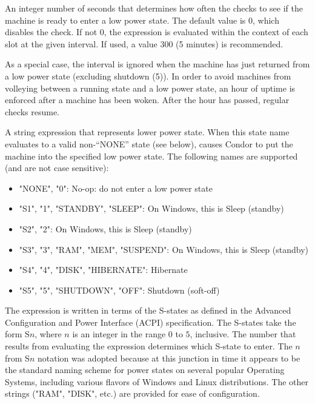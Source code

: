 \begin{description}

\label{param:HibernateCheckInterval}
\item[\Macro{HIBERNATE\_CHECK\_INTERVAL}]
  An integer number of seconds that
  determines how often the  checks to see if the 
  machine is ready to enter a low power state.
  The default value is 0,
  which disables the check.
  If not 0, the  expression is
  evaluated within the context of each slot at the given interval.  
  If used, a value 300 (5 minutes) is recommended.

  As a special case, the interval is ignored when the 
  machine has just returned from a low power state (excluding 
  shutdown (5)).  In order to avoid machines from volleying between 
  a running state and a low power state, an hour of uptime is enforced
  after a machine has been woken.  After the hour has passed,
  regular checks resume.

\label{param:Hibernate}
\item[\Macro{HIBERNATE}]
  A string expression that represents lower power state.  When this
  state name evaluates to a valid non-``NONE'' state (see below),
  causes Condor to put the machine into the specified low power state.
  The following names are supported
  (and are not case sensitive):

  \begin{itemize}
  \item[] "NONE", "0": No-op: do not enter a low power state
  \item[] "S1",   "1", "STANDBY", "SLEEP": On Windows, this is Sleep (standby)
  \item[] "S2",   "2": On Windows, this is Sleep (standby)
  \item[] "S3",   "3", "RAM", "MEM", "SUSPEND": On Windows, this is Sleep (standby)
  \item[] "S4",   "4", "DISK", "HIBERNATE": Hibernate
  \item[] "S5",   "5", "SHUTDOWN", "OFF": Shutdown (soft-off)
  \end{itemize}
  
  The  expression is written in terms of the S-states
  as defined in the Advanced Configuration and Power Interface 
  (ACPI) specification.  The S-states take the form S$n$, where $n$ is 
  an integer in the range $0$ to $5$, inclusive.  The number that results 
  from evaluating the expression determines which S-state to enter. The 
  $n$ from S$n$ notation was adopted because at this junction in time 
  it appears to be the standard naming scheme for power states on several
  popular Operating Systems, including various flavors of Windows and Linux
  distributions.  The other strings ("RAM", "DISK", etc.) are
  provided for ease of configuration.


\end{description}
